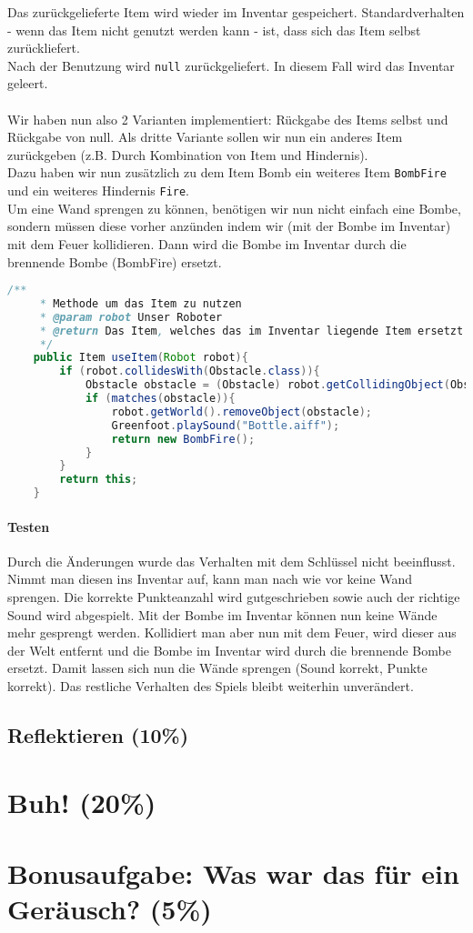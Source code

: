 \documentclass{pi1}
\begin{document}
Das zurückgelieferte Item wird wieder im Inventar gespeichert. Standardverhalten - wenn das Item nicht genutzt werden kann - ist, dass sich das Item selbst zurückliefert.\\
Nach der Benutzung wird \texttt{null} zurückgeliefert. In diesem Fall wird das Inventar geleert.\\
\\
Wir haben nun also 2 Varianten implementiert: Rückgabe des Items selbst und Rückgabe von null. Als dritte Variante sollen wir nun ein anderes Item zurückgeben (z.B. Durch Kombination von Item und Hindernis).\\
Dazu haben wir nun zusätzlich zu dem Item Bomb ein weiteres Item \texttt{BombFire} und ein weiteres Hindernis \texttt{Fire}.\\
Um eine Wand sprengen zu können, benötigen wir nun nicht einfach eine Bombe, sondern müssen diese vorher anzünden indem wir (mit der Bombe im Inventar) mit dem Feuer kollidieren. Dann wird die Bombe im Inventar durch die brennende Bombe (BombFire) ersetzt.

\begin{lstlisting}[caption={Klasse \emph{Bomb}, Methode \emph{useItem()}},firstnumber=11, language=Java]
/**
     * Methode um das Item zu nutzen
     * @param robot Unser Roboter
     * @return Das Item, welches das im Inventar liegende Item ersetzt
     */
    public Item useItem(Robot robot){
        if (robot.collidesWith(Obstacle.class)){
            Obstacle obstacle = (Obstacle) robot.getCollidingObject(Obstacle.class);
            if (matches(obstacle)){
                robot.getWorld().removeObject(obstacle);
                Greenfoot.playSound("Bottle.aiff");
                return new BombFire();
            }
        }
        return this;
    }
\end{lstlisting}

\paragraph{Testen} Durch die Änderungen wurde das Verhalten mit dem Schlüssel nicht beeinflusst. Nimmt man diesen ins Inventar auf, kann man nach wie vor keine Wand sprengen. Die korrekte Punkteanzahl wird gutgeschrieben sowie auch der richtige Sound wird abgespielt. Mit der Bombe im Inventar können nun keine Wände mehr gesprengt werden. Kollidiert man aber nun mit dem Feuer, wird dieser aus der Welt entfernt und die Bombe im Inventar wird durch die brennende Bombe ersetzt. Damit lassen sich nun die Wände sprengen (Sound korrekt, Punkte korrekt). Das restliche Verhalten des Spiels bleibt weiterhin unverändert.

\subsection{Reflektieren (10\%)}

\section{Buh! (20\%)}

\section{Bonusaufgabe: Was war das für ein Geräusch? (5\%)}
\end{document}
